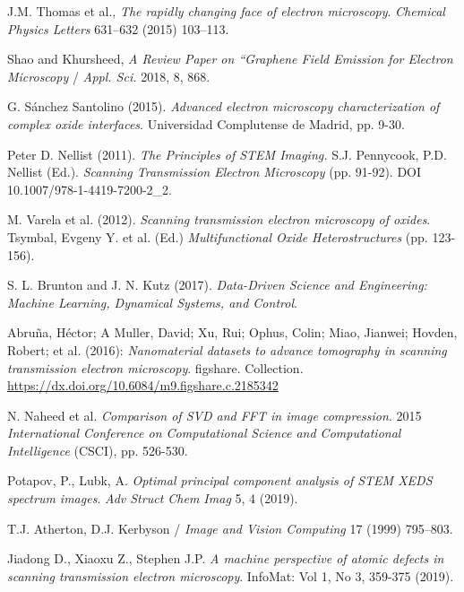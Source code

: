 
 \normalsize



\begin{thebibliography}{9}

J.M. Thomas et al., \textit{The rapidly changing face of electron microscopy}. \textit{Chemical Physics Letters} 631–632 (2015) 103–113.

Shao and Khursheed, \textit{A Review Paper on “Graphene Field Emission for Electron Microscopy} / \textit{Appl. Sci.} 2018, 8, 868.

G. Sánchez Santolino (2015). \textit{Advanced electron microscopy characterization of complex oxide interfaces}. Universidad Complutense de Madrid, pp. 9-30.

Peter D. Nellist (2011). \textit{The Principles of STEM Imaging.} S.J. Pennycook, P.D. Nellist (Ed.). \textit{Scanning Transmission Electron Microscopy }(pp. 91-92). DOI 10.1007/978-1-4419-7200-2\_2. 

M. Varela et al. (2012). \textit{Scanning transmission electron microscopy of oxides}. Tsymbal, Evgeny Y. et al. (Ed.) \textit{Multifunctional Oxide Heterostructures} (pp. 123-156).

S. L. Brunton and J. N. Kutz (2017). \textit{Data-Driven Science and Engineering: Machine Learning, Dynamical Systems, and Control}.

Abruña, Héctor; A Muller, David; Xu, Rui; Ophus, Colin; Miao, Jianwei; Hovden, Robert; et al. (2016): \textit{Nanomaterial datasets to advance tomography in scanning transmission electron microscopy}. figshare. Collection. \href{https://dx.doi.org/10.6084/m9.figshare.c.2185342}{https://dx.doi.org/10.6084/m9.figshare.c.2185342}

N. Naheed et al. \textit{Comparison of SVD and FFT in image compression}. 2015 \textit{International Conference on Computational Science and Computational Intelligence} (CSCI), pp. 526-530.

Potapov, P., Lubk, A. \textit{Optimal principal component analysis of STEM XEDS spectrum images}. \textit{Adv Struct Chem Imag} 5, 4 (2019). 

T.J. Atherton, D.J. Kerbyson / \textit{Image and Vision Computing} 17 (1999) 795–803.

Jiadong D., Xiaoxu Z., Stephen J.P. \textit{A machine perspective of atomic defects in scanning transmission electron microscopy}. InfoMat: Vol 1, No 3, 359-375 (2019).


\end{thebibliography}
